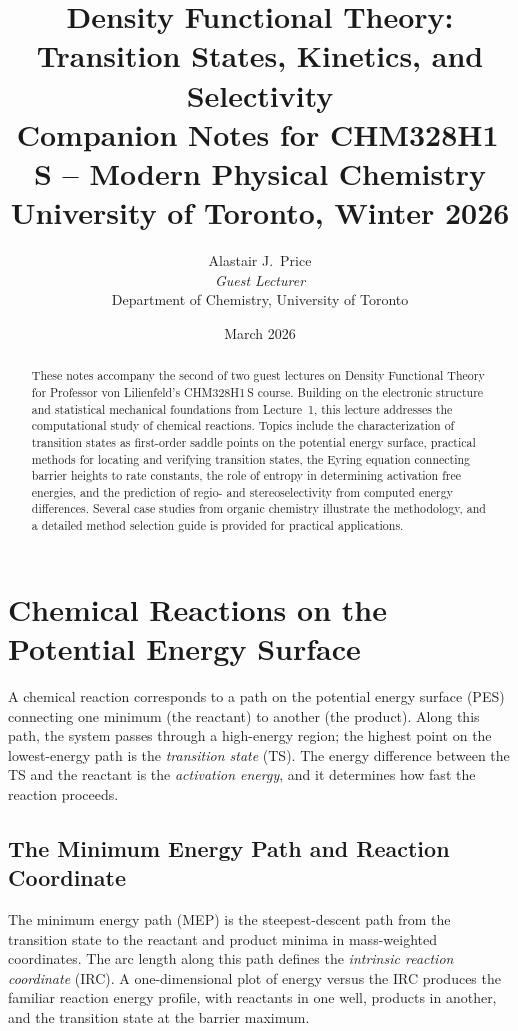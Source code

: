 \documentclass[11pt]{article}
\title{\textbf{Density Functional Theory:\\Transition States, Kinetics, and Selectivity}\\[1em]
\large Companion Notes for CHM328H1\,S -- Modern Physical Chemistry\\
University of Toronto, Winter 2026}
\author{Alastair J.\ Price\\
\textit{Guest Lecturer}\\
\small Department of Chemistry, University of Toronto}
\date{March 2026}
\numberwithin{equation}{section}
\begin{document}
\maketitle
\thispagestyle{fancy}

\begin{abstract}
\noindent
These notes accompany the second of two guest lectures on Density Functional Theory for Professor von Lilienfeld's CHM328H1\,S course. Building on the electronic structure and statistical mechanical foundations from Lecture~1, this lecture addresses the computational study of chemical reactions. Topics include the characterization of transition states as first-order saddle points on the potential energy surface, practical methods for locating and verifying transition states, the Eyring equation connecting barrier heights to rate constants, the role of entropy in determining activation free energies, and the prediction of regio- and stereoselectivity from computed energy differences. Several case studies from organic chemistry illustrate the methodology, and a detailed method selection guide is provided for practical applications.
\end{abstract}

\tableofcontents
\newpage

\section{Chemical Reactions on the Potential Energy Surface}
\label{sec:PES_reactions}

A chemical reaction corresponds to a path on the potential energy surface (PES) connecting one minimum (the reactant) to another (the product). Along this path, the system passes through a high-energy region; the highest point on the lowest-energy path is the \emph{transition state} (TS). The energy difference between the TS and the reactant is the \emph{activation energy}, and it determines how fast the reaction proceeds.

\subsection{The Minimum Energy Path and Reaction Coordinate}

The minimum energy path (MEP) is the steepest-descent path from the transition state to the reactant and product minima in mass-weighted coordinates. The arc length along this path defines the \emph{intrinsic reaction coordinate} (IRC). A one-dimensional plot of energy versus the IRC produces the familiar reaction energy profile, with reactants in one well, products in another, and the transition state at the barrier maximum.
\end{document}
